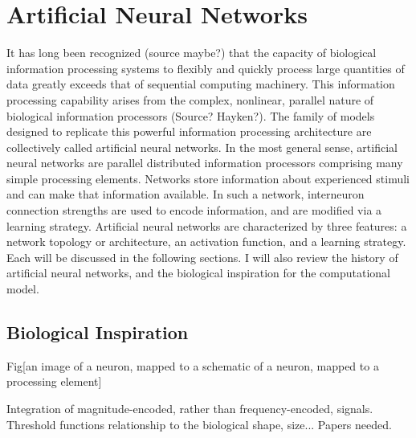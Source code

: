 \documentclass[11pt]{afthesis}
\begin{document}
\section{Artificial Neural Networks}


It has long been recognized (source maybe?) that the capacity of biological information processing systems to flexibly and quickly process large quantities of data greatly exceeds that of sequential computing machinery. This information processing capability arises from the complex, nonlinear, parallel nature of biological information processors (Source? Hayken?). The family of models designed to replicate this powerful information processing architecture are collectively called artificial neural networks. In the most general sense, artificial neural networks are parallel distributed information processors \cite{haykin1999} comprising many simple processing elements. Networks store information about experienced stimuli and can make that information available. In such a network, interneuron connection strengths are used to encode information, and are modified via a learning strategy. Artificial neural networks are characterized by three features: a network topology or architecture, an activation function, and a learning strategy. Each will be discussed in the following sections. I will also review the history of artificial neural networks, and the biological inspiration for the computational model.

\subsection{Biological Inspiration}

Fig[an image of a neuron, mapped to a schematic of a neuron, mapped to a processing element]

Integration of magnitude-encoded, rather than frequency-encoded, signals. 
Threshold functions relationship to the biological shape, size... Papers needed.
\end{document}
